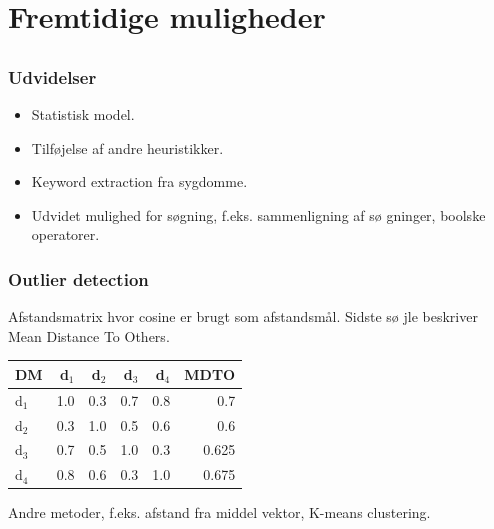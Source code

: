 \documentclass[xcolor=table]{beamer}
\begin{document}
\section{Fremtidige muligheder}

\subsection*{}

\begin{frame}

  \frametitle{Udvidelser}

  \begin{itemize}
    \item Statistisk model.
    \item Tilf\o jelse af andre heuristikker.
    \item Keyword extraction fra sygdomme.
    \item Udvidet mulighed for s\o gning, f.eks. sammenligning af s\o
      gninger, boolske operatorer.
  \end{itemize}

\end{frame}

\begin{frame}

  \frametitle{Outlier detection}

  Afstandsmatrix hvor cosine er brugt som afstandsm\aa l. Sidste s\o
  jle beskriver Mean Distance To Others.

  \begin{center}
    \begin{tabular}{|l|r|r|r|r|r|}
      \hline
      DM    & d$_1$ & d$_2$ & d$_3$ & d$_4$ & MDTO \\
      \hline
      d$_1$ &   1.0 &   0.3 &   0.7 &   0.8 & 0.7 \\
      \hline
      d$_2$ &   0.3 &   1.0 &   0.5 &   0.6 & 0.6 \\
      \hline
      d$_3$ &   0.7 &   0.5 &   1.0 &   0.3 & 0.625 \\
      \hline
      d$_4$ &   0.8 &   0.6 &   0.3 &   1.0 & 0.675 \\
      \hline
    \end{tabular}
  \end{center}


  Andre metoder, f.eks. afstand fra middel vektor, K-means
  clustering.

\end{frame}
\end{document}
